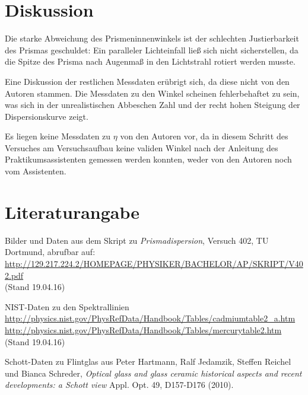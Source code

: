 \section{Diskussion}
\label{sec:Diskussion}
	Die starke Abweichung des Prismeninnenwinkels ist der schlechten Justierbarkeit des Prismas geschuldet: Ein paralleler Lichteinfall ließ sich nicht sicherstellen, da die Spitze des Prisma nach Augenmaß in den Lichtstrahl rotiert werden musste. 

	Eine Diskussion der restlichen Messdaten erübrigt sich, da diese nicht von den Autoren stammen. Die Messdaten zu den Winkel scheinen fehlerbehaftet zu sein, was sich in der unrealistischen Abbeschen Zahl und der recht hohen Steigung der Dispersionskurve zeigt.

	Es liegen keine Messdaten zu $\eta$ von den Autoren vor, da in diesem Schritt des Versuches am Versuchsaufbau keine validen Winkel nach der Anleitung des Praktikumsassistenten gemessen werden konnten, weder von den Autoren noch vom Assistenten.



\newpage
\section{Literaturangabe}
\label{sec:Literatur}

Bilder und Daten aus dem Skript zu \emph{Prismadispersion}, Versuch 402, TU Dortmund, abrufbar auf:\\
\url{http://129.217.224.2/HOMEPAGE/PHYSIKER/BACHELOR/AP/SKRIPT/V402.pdf}\\(Stand 19.04.16)\par

NIST-Daten zu den Spektrallinien\\
\url{http://physics.nist.gov/PhysRefData/Handbook/Tables/cadmiumtable2_a.htm}\\
\url{http://physics.nist.gov/PhysRefData/Handbook/Tables/mercurytable2.htm}\\(Stand 19.04.16)

Schott-Daten zu Flintglas aus Peter Hartmann, Ralf Jedamzik, Steffen Reichel und Bianca Schreder, \emph{Optical glass and glass ceramic historical aspects and recent developments: a Schott view} Appl. Opt. 49, D157-D176 (2010).